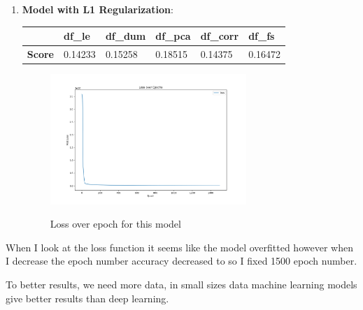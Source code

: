 \begin{enumerate}[]
  \item \textbf{Model with L1 Regularization}: 
\begin{table}[H]
\begin{tabular}{l|l|l|l|l|l|}
\cline{2-6}
                                   & \textbf{df\_le} & \textbf{df\_dum} & \textbf{df\_pca} & \textbf{df\_corr} & \textbf{df\_fs} \\ \hline
\multicolumn{1}{|l|}{\textbf{Score}} & 0.14233         & 0.15258           & 0.18515          & 0.14375           & 0.16472         \\ \hline
\end{tabular}
\end{table}
  
\begin{figure}[H]
  \centering
  \includegraphics[width=0.7\textwidth]{./fig/losofregdeeep.png}
  \label{fig:corr1}
  \caption{Loss over epoch for this model}
\end{figure}
\end{enumerate}
When I look at the loss function it seems like the model overfitted however when I decrease the epoch number accuracy decreased to so I fixed 1500 epoch number.

To better results, we need more data, in small sizes data machine learning models give better results than deep learning. 

\newpage
